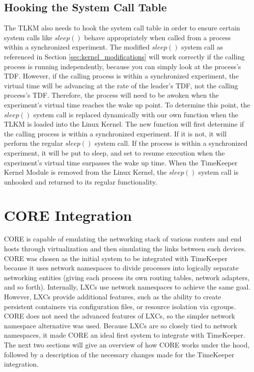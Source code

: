 \subsection{Hooking the System Call Table}
\label{sec:hooking}
The TLKM also needs to hook the system call table in order to ensure certain system calls like $sleep()$ behave appropriately when called from a process within a synchronized experiment. The modified $sleep()$ system call as referenced in Section \ref{sec:kernel_modifications} will work correctly if the calling process is running independently, because you can simply look at the process's TDF. However, if the calling process is within a synchronized experiment, the virtual time will be advancing at the rate of the leader's TDF, not the calling process's TDF. Therefore, the process will need to be awoken when the experiment's virtual time reaches the wake up point. To determine this point, the $sleep()$ system call is replaced dynamically with our own function when the TLKM is loaded into the Linux Kernel. The new function will first determine if the calling process is within a synchronized experiment. If it is not, it will perform the regular $sleep()$ system call. If the process is within a synchronized experiment, it will be put to sleep, and set to resume execution when the experiment's virtual time surpasses the wake up time. When the TimeKeeper Kernel Module is removed from the Linux Kernel, the $sleep()$ system call is unhooked and returned to its regular functionality.

\section{CORE Integration}
CORE is capable of emulating the networking stack of various routers and end hosts through virtualization and then simulating the links between such devices. CORE was chosen as the initial system to be integrated with TimeKeeper because it uses network namespaces to divide processes into logically separate networking entities (giving each process its own routing tables, network adapters, and so forth). Internally, LXCs use network namespaces to achieve the same goal. However, LXCs provide additional features, such as the ability to create persistent containers via configuration files, or resource isolation via cgroups. CORE does not need the advanced features of LXCs, so the simpler network namespace alternative was used. Because LXCs are so closely tied to network namespaces, it made CORE an ideal first system to integrate with TimeKeeper. The next two sections will give an overview of how CORE works under the hood, followed by a description of the necessary changes made for the TimeKeeper integration. 
